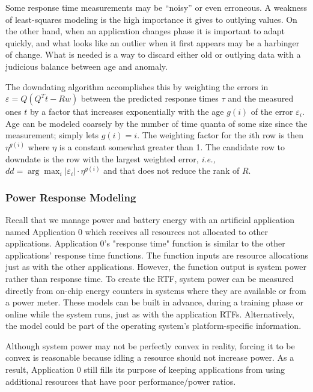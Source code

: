 Some response time measurements may be ``noisy'' or even erroneous.
A weakness of least-squares modeling is the high importance it gives to outlying values.
On the other hand, when an application changes phase it is important to adapt quickly,
and what looks like an outlier when it first appears may be a harbinger of change.
What is needed is a way to discard either old or outlying data
with a judicious balance between age and anomaly.

The downdating algorithm accomplishes this by weighting the errors in $\varepsilon = Q(Q^Tt - Rw)$
between the predicted response times $\tau$ and the measured ones $t$ by a factor
that increases exponentially with the age $g(i)$ of the error $\varepsilon_i$.
Age can be modeled coarsely by the number of time quanta of some size since the measurement;
\pacora simply lets $g(i) = i$.
The weighting factor for the $i$th row is then $\eta^{g(i)}$ where $\eta$ is a constant somewhat greater than 1.
The candidate row to downdate is the row with the largest weighted error, \emph{i.e.,}
$dd = \arg\max_i |\varepsilon_i| \cdot \eta^{g(i)}$ and that does not reduce the rank of $R$.


\subsubsection{Power Response Modeling}
Recall that we manage power and battery energy with an artificial application named Application 0 which receives all resources not allocated to other applications. Application 0's "response time" function is similar to the other applications' response time functions.  The function inputs are resource allocations just as with the other applications.  However, the function output is system power rather than response time.   To create the RTF, system power can be measured directly from on-chip energy counters in systems where they are available or from a power meter.  These models can be built in advance, during a training phase or online while the system runs, just as with the application RTFs.  Alternatively, the model could be part of the operating system's platform-specific information.

Although system power may not be perfectly convex in reality, forcing it to be convex is reasonable because idling a resource should not increase power.  As a result, Application 0 still fills its purpose of keeping applications from using additional resources that have poor performance/power ratios.

